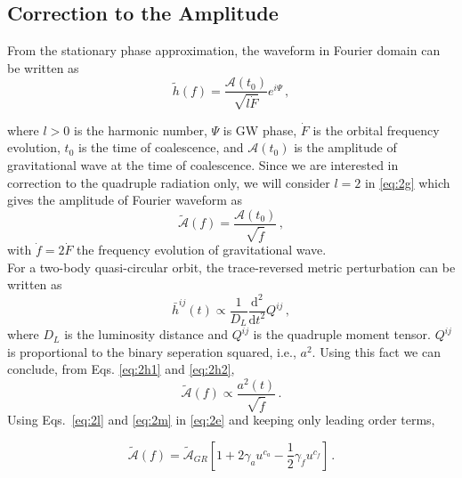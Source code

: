 \documentclass[11pt]{article}
\begin{document}
 \subsection{Correction to the Amplitude}
 
 \hspace{15.5pt}From the stationary phase approximation\cite{Yunes:2009yz}\cite{PhysRevD.62.084036}, the waveform in Fourier domain can be written as
 \begin{equation}\label{eq:2g}
 \tilde{h}(f)=\frac{\mathcal{A}(t_0)}{\sqrt{l\dot{F}}}e^{i\Psi}\,,
 \end{equation}
 
where $l>0$ is the harmonic number, $\Psi$ is GW phase, $\dot{F}$ is the orbital frequency evolution, $t_0$ is the time of coalescence, and $\mathcal{A}(t_0)$ is the amplitude of gravitational wave at the time of coalescence. Since we are interested in correction to the quadruple radiation only, we will consider $l=2$ in \eqref{eq:2g} which gives the amplitude of Fourier waveform as
\begin{equation}\label{eq:2h1}
\tilde{\mathcal{A}}(f)=\frac{\mathcal{A}(t_0)}{\sqrt{\dot{f}}}\,,
\end{equation}
with $\dot{f}=2\dot{F}$ the frequency evolution of gravitational wave.\\
\hspace{15.5pt}For a two-body quasi-circular orbit, the trace-reversed metric perturbation can be written as \cite{Blanchet:2002av}
 \begin{equation}\label{eq:2h2}
\bar{h}^{ij}(t)\propto \frac{1}{D_L}\frac{\mathrm{d^2} }{\mathrm{d} t^2}Q^{ij}\,,
 \end{equation}
 where $D_L$ is the luminosity distance and $Q^{ij}$ is the quadruple moment tensor. $Q^{ij}$ is proportional to the binary seperation squared, i.e., $a^2$. Using this fact we can conclude, from Eqs. \eqref{eq:2h1} and \eqref{eq:2h2}, 
\begin{equation}\label{eq:2e}
\tilde{\mathcal{A}}(f)\propto \frac{a^2(t)}{\sqrt{\dot{f}}}\,.
\end{equation}
Using Eqs.~\eqref{eq:2l} and \eqref{eq:2m} in \eqref{eq:2e} and keeping only leading order terms,

\begin{equation}\label{eq:2n}
\tilde{\mathcal{A}}(f)=\tilde{\mathcal{A}}_{GR} \left[1+2\gamma_au^{c_a}-\frac{1}{2}\gamma_{\dot{f}}u^{c_{\dot{f}}}\right]\,.
\end{equation}
\end{document}

